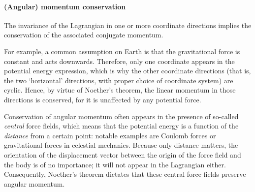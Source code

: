 \paragraph{(Angular) momentum conservation} The invariance of the Lagrangian in one or more coordinate directions implies the conservation of the associated conjugate momentum. 

For example, a common assumption on Earth is that the gravitational force is constant and acts downwards. Therefore, only one coordinate appears in the potential energy expression, which is why the other coordinate directions (that is, the two `horizontal' directions, with proper choice of coordinate system) are cyclic. Hence, by virtue of Noether's theorem, the linear momentum in those directions is conserved, for it is unaffected by any potential force.

Conservation of angular momentum often appears in the presence of so-called \emph{central} force fields, which means that the potential energy is a function of the \emph{distance} from a certain point: notable examples are Coulomb forces or gravitational forces in celestial mechanics. Because only distance matters, the orientation of the displacement vector between the origin of the force field and the body is of no importance; it will not appear in the Lagrangian either. Consequently, Noether's theorem dictates that these central force fields preserve angular momentum.


